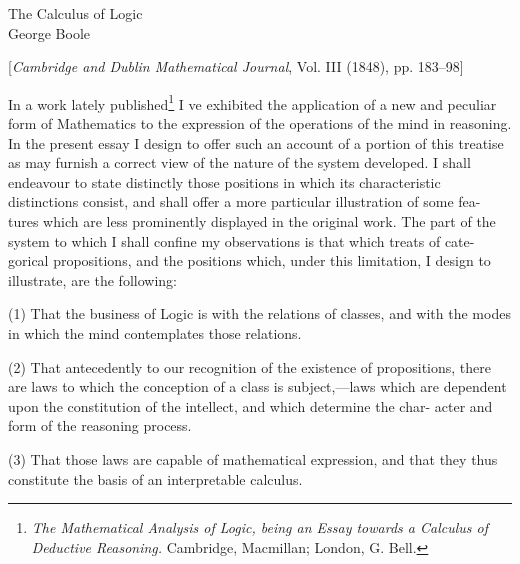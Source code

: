 \documentclass{article}
\begin{document}
\begin{center}
\vspace{1cm}
{\huge  The Calculus of Logic}
\vspace{.25in}\\
{\large George Boole\\}

\vspace{.5cm}
{\normalsize [\textit {Cambridge and Dublin Mathematical Journal}, Vol. III (1848), pp. 183–98]\\}
\end{center}
 \hspace{.2in}
    {\normalsize In a work lately published\footnote[1]{\footnotesize{\textit {   The Mathematical Analysis of Logic, being an Essay towards a Calculus of Deductive
Reasoning.
} Cambridge, Macmillan; London, G. Bell.}} I ve exhibited the application of a new and
peculiar form of Mathematics to the expression of the operations of the mind in
reasoning. In the present essay I design to offer such an account of a portion of
this treatise as may furnish a correct view of the nature of the system developed.
I shall endeavour to state distinctly those positions in which its characteristic
distinctions consist, and shall offer a more particular illustration of some fea-
tures which are less prominently displayed in the original work. The part of
the system to which I shall confine my observations is that which treats of cate-
gorical propositions, and the positions which, under this limitation, I design to
illustrate, are the following:\vspace{.05in}
\hspace{.2in}

 (1) That the business of Logic is with the relations of classes, and with the
modes in which the mind contemplates those relations.\vspace{.05in}

\hspace{.2in}

 (2) That antecedently to our recognition of the existence of propositions,
there are laws to which the conception of a class is subject,—laws which are
dependent upon the constitution of the intellect, and which determine the char-
acter and form of the reasoning process.\vspace{.05in}

\hspace{.2in}


    (3) That those laws are capable of mathematical expression, and that they
thus constitute the basis of an interpretable calculus.\vspace{.05in}

}
\end{document}
